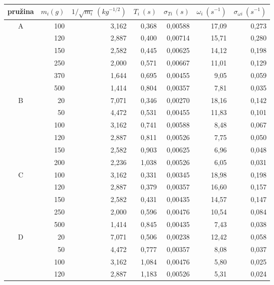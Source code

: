 \documentclass{article}
\begin{document}
\begin{table}[htbp]
\begin{center}
\begin{tabular}{|c||r|r|r|r|r|r|}
\hline
\multicolumn{1}{|c||}{pružina} & \multicolumn{1}{c|}{$m_{i} (g)$} & \multicolumn{1}{c|}{$1/\sqrt{m_{i}} ~(kg^{-1/2})$} & \multicolumn{1}{c|}{$T_{i} ~(s)$} & \multicolumn{1}{c|}{$\sigma _{Ti} ~(s)$} & \multicolumn{1}{c|}{$\omega _{i} ~(s^{-1})$} & \multicolumn{1}{c|}{$\sigma _{\omega i} ~(s^{-1}) $} \\ \hline \hline
\multirow{6}{*}{\centering A} & 100 & 3,162 & 0,368 & 0,00588 & 17,09 & 0,273 \\ 
&  120 & 2,887 & 0,400 & 0,00714 & 15,71 & 0,280 \\ 
&  150 & 2,582 & 0,445 & 0,00625 & 14,12 & 0,198 \\ 
 & 250 & 2,000 & 0,571 & 0,00667 & 11,01 & 0,129 \\ 
&  370 & 1,644 & 0,695 & 0,00455 & 9,05 & 0,059 \\ 
&  500 & 1,414 & 0,804 & 0,00357 & 7,81 & 0,035 \\ \hline
\multirow{6}{*}{\centering B} & 20 & 7,071 & 0,346 & 0,00270 & 18,16 & 0,142 \\ 
&  50 & 4,472 & 0,531 & 0,00455 & 11,83 & 0,101 \\ 
&  100 & 3,162 & 0,741 & 0,00588 & 8,48 & 0,067 \\ 
&  120 & 2,887 & 0,811 & 0,00526 & 7,75 & 0,050 \\
&  150 & 2,582 & 0,903 & 0,00625 & 6,96 & 0,048 \\ 
&  200 & 2,236 & 1,038 & 0,00526 & 6,05 & 0,031 \\ \hline
\multirow{5}{*}{\centering C} & 100 & 3,162 & 0,331 & 0,00345 & 18,98 & 0,198 \\ 
&  120 & 2,887 & 0,379 & 0,00357 & 16,60 & 0,157 \\
&  150 & 2,582 & 0,431 & 0,00435 & 14,57 & 0,147 \\ 
&  250 & 2,000 & 0,596 & 0,00476 & 10,54 & 0,084 \\ 
&  500 & 1,414 & 0,845 & 0,00435 & 7,43 & 0,038 \\ \hline
\multirow{5}{*}{\centering D}  & 20 & 7,071 & 0,506 & 0,00238 & 12,42 & 0,058 \\ 
&  50 & 4,472 & 0,777 & 0,00357 & 8,08 & 0,037 \\ 
&  100 & 3,162 & 1,084 & 0,00476 & 5,80 & 0,025 \\
&  120 & 2,887 & 1,183 & 0,00526 & 5,31 & 0,024 \\ 

\end{tabular}
\end{center}
\end{table}
\end{document}
